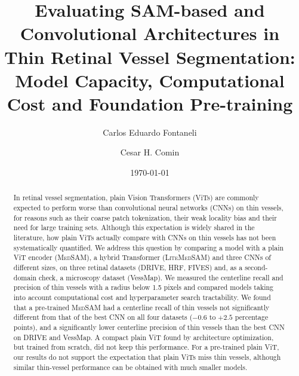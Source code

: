 \documentclass[%
 reprint,
 superscriptaddress,
 showkeys,
 longbibliography,
 aps,
 nofootinbib,
 amsmath,
 amssymb
]{revtex4-1}
\newcommand{\medsam}{\textsc{MedSAM}}
\newcommand{\litemedsam}{\textsc{LiteMedSAM}}
\begin{document}
\title{Evaluating SAM-based and Convolutional Architectures in Thin Retinal Vessel Segmentation: Model Capacity, Computational Cost and Foundation Pre-training}

\author{Carlos Eduardo Fontaneli}

\author{Cesar H. Comin}

\date{\today}

\begin{abstract}
In retinal vessel segmentation, plain Vision Transformers (ViTs) are commonly expected to perform worse than convolutional neural networks (CNNs) on thin vessels, for reasons such as their coarse patch tokenization, their weak locality bias and their need for large training sets. Although this expectation is widely shared in the literature, how plain ViTs actually compare with CNNs on thin vessels has not been systematically quantified. We address this question by comparing a model with a plain ViT encoder (\medsam{}), a hybrid Transformer (\litemedsam{}) and three CNNs of different sizes, on three retinal datasets (DRIVE, HRF, FIVES) and, as a second-domain check, a microscopy dataset (VessMap). We measured the centerline recall and precision of thin vessels with a radius below 1.5 pixels and compared models taking into account computational cost and hyperparameter search tractability. We found that a pre-trained \medsam{} had a centerline recall of thin vessels not significantly different from that of the best CNN on all four datasets ($-0.6$ to $+2.5$ percentage points), and a significantly lower centerline precision of thin vessels than the best CNN on DRIVE and VessMap. A compact plain ViT found by architecture optimization, but trained from scratch, did not keep this performance. For a pre-trained plain ViT, our results do not support the expectation that plain ViTs miss thin vessels, although similar thin-vessel performance can be obtained with much smaller models.
\end{abstract}


\maketitle









\end{document}
